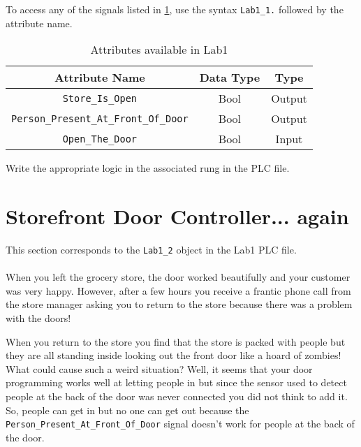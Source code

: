To access any of the signals listed in \tableautorefname \ref{Table:Lab1_1Attributes}, use the syntax \verb|Lab1_1.| followed by the attribute name. 

\begin{table}[h]
\centering
\caption{Attributes available in Lab1}
\label{Table:Lab1_1Attributes}
\begin{tabular}{c c c}
\toprule
Attribute Name & Data Type & Type\\
\midrule
\verb|Store_Is_Open| & Bool & Output \\
\verb|Person_Present_At_Front_Of_Door| &  Bool & Output \\
\midrule
\verb|Open_The_Door| & Bool & Input\\
\bottomrule
\end{tabular}
\end{table}

Write the appropriate logic in the associated rung in the PLC file.

\TASignatureSlot



\section{Storefront Door Controller... again}

This section corresponds to the \verb|Lab1_2| object in the Lab1 PLC file.
\\ 
\\
When you left the grocery store, the door worked beautifully and your customer was very happy. However, after a few hours you receive a frantic phone call from the store manager asking you to return to the store because there was a problem with the doors!

When you return to the store you find that the store is packed with people but they are all standing inside looking out the front door like a hoard of zombies! What could cause such a weird situation? Well, it seems that your door programming works well at letting people in but since the sensor used to detect people at the back of the door was never connected you did not think to add it. So, people can get in but no one can get out because the \verb|Person_Present_At_Front_Of_Door| signal doesn't work for people at the back of the door.


